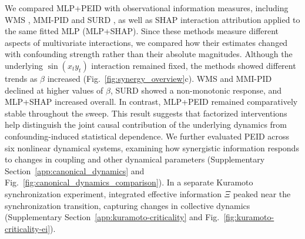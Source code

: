 \documentclass[fleqn,10pt]{wlscirep}
\theoremstyle{naturetheorem}
\begin{document}
We compared MLP+PEID with observational information measures, including WMS \cite{Oizumi2016MeasuringII}, MMI-PID \cite{barrett2015exploration} and SURD \cite{MartnezSnchez2024DecomposingCI}, as well as SHAP interaction attribution \cite{lundberg2017unified} applied to the same fitted MLP (MLP+SHAP). Since these methods measure different aspects of multivariate interactions, we compared how their estimates changed with confounding strength rather than their absolute magnitudes. Although the underlying $\sin(x_t y_t)$ interaction remained fixed, the methods showed different trends as $\beta$ increased (Fig.~\ref{fig:synergy_overview}c). WMS and MMI-PID declined at higher values of $\beta$, SURD showed a non-monotonic response, and MLP+SHAP increased overall. In contrast, MLP+PEID remained comparatively stable throughout the sweep. This result suggests that factorized interventions help distinguish the joint causal contribution of the underlying dynamics from confounding-induced statistical dependence. We further evaluated PEID across six nonlinear dynamical systems, examining how synergistic information responds to changes in coupling and other dynamical parameters (Supplementary Section~\ref{app:canonical_dynamics} and Fig.~\ref{fig:canonical_dynamics_comparison}). In a separate Kuramoto synchronization experiment, integrated effective information $\Xi$ peaked near the synchronization transition, capturing changes in collective dynamics (Supplementary Section~\ref{app:kuramoto-criticality} and Fig.~\ref{fig:kuramoto-criticality-ei}).



\end{document}
